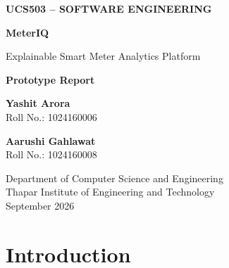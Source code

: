 \documentclass[12pt,a4paper]{report}
\begin{document}

\begin{titlepage}

\centering

\vspace*{1.5cm}

{\Large\bfseries UCS503 -- SOFTWARE ENGINEERING\par}

\vspace{1cm}

{\Huge\bfseries MeterIQ\par}

\vspace{0.3cm}

{\Large Explainable Smart Meter Analytics Platform\par}

\vspace{1.2cm}

{\large\bfseries Prototype Report\par}

\vspace{1.2cm}

{\large
\textbf{Yashit Arora}\\
Roll No.: 1024160006
\par}

\vspace{0.5cm}

{\large
\textbf{Aarushi Gahlawat}\\
Roll No.: 1024160008
\par}

\vfill

{\large
Department of Computer Science and Engineering\\
Thapar Institute of Engineering and Technology\\
September 2026
\par}

\end{titlepage}



\chapter{Introduction}
\end{document}
